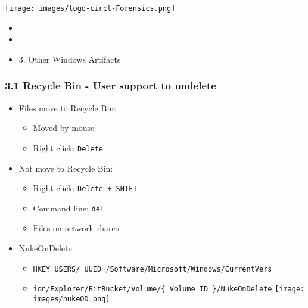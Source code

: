 %
%



\begin{frame}
    \texttt{[image: images/logo-circl-Forensics.png]}
    \begin{itemize}
        \item[]
        \item[]
        \item[] 3. Other Windows Artifacts
    \end{itemize}
\end{frame}


\begin{frame}[fragile]
  \frametitle{3.1 Recycle Bin - User support to undelete}
    \begin{itemize}
        \item Files move to Recycle Bin:
            \begin{itemize}
                \item Moved by mouse
		\item Right click: \texttt{Delete}
            \end{itemize}
        \item Not move to Recycle Bin:
            \begin{itemize}
		    \item Right click: \texttt{Delete + SHIFT}
		    \item Command line: \texttt{del}
		\item Files on network shares
            \end{itemize}
        \item NukeOnDelete
            \begin{itemize}
		    \item \texttt{HKEY\_USERS/\_UUID\_/Software/Microsoft/Windows/CurrentVers}
		    \item[]\texttt{ion/Explorer/BitBucket/Volume/\{\_Volume ID\_\}/NukeOnDelete}
                    \texttt{[image: images/nukeOD.png]}
            \end{itemize}
    \end{itemize}
\end{frame}


